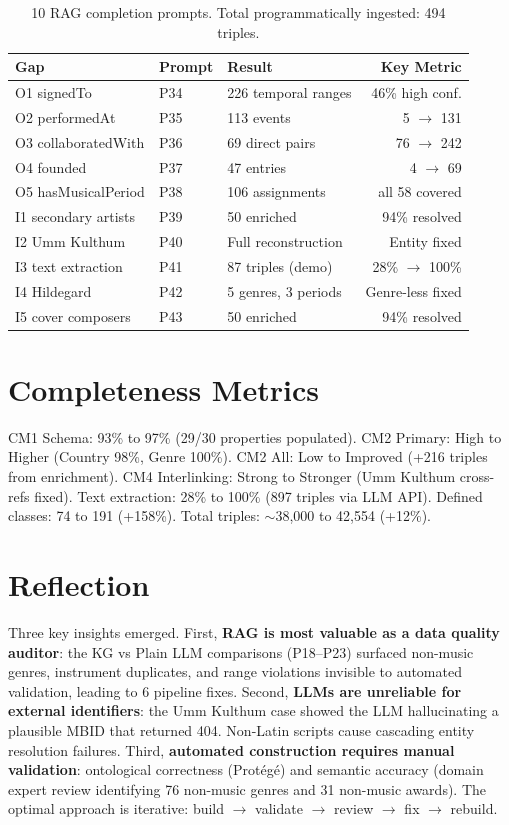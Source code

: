 \documentclass[11pt,a4paper]{article}
\begin{document}
\begin{table}[h]
\centering
\small
\begin{tabular}{lllr}
\toprule
\textbf{Gap} & \textbf{Prompt} & \textbf{Result} & \textbf{Key Metric} \\
\midrule
O1 signedTo & P34 & 226 temporal ranges & 46\% high conf. \\
O2 performedAt & P35 & 113 events & 5 $\rightarrow$ 131 \\
O3 collaboratedWith & P36 & 69 direct pairs & 76 $\rightarrow$ 242 \\
O4 founded & P37 & 47 entries & 4 $\rightarrow$ 69 \\
O5 hasMusicalPeriod & P38 & 106 assignments & all 58 covered \\
I1 secondary artists & P39 & 50 enriched & 94\% resolved \\
I2 Umm Kulthum & P40 & Full reconstruction & Entity fixed \\
I3 text extraction & P41 & 87 triples (demo) & 28\% $\rightarrow$ 100\% \\
I4 Hildegard & P42 & 5 genres, 3 periods & Genre-less fixed \\
I5 cover composers & P43 & 50 enriched & 94\% resolved \\
\bottomrule
\end{tabular}
\caption{10 RAG completion prompts. Total programmatically ingested: 494 triples.}
\end{table}

\section{Completeness Metrics}

CM1 Schema: 93\% to 97\% (29/30 properties populated). CM2 Primary: High to Higher (Country 98\%, Genre 100\%). CM2 All: Low to Improved (+216 triples from enrichment). CM4 Interlinking: Strong to Stronger (Umm Kulthum cross-refs fixed). Text extraction: 28\% to 100\% (897 triples via LLM API). Defined classes: 74 to 191 (+158\%). Total triples: $\sim$38,000 to 42,554 (+12\%).

\section{Reflection}

Three key insights emerged. First, \textbf{RAG is most valuable as a data quality auditor}: the KG vs Plain LLM comparisons (P18--P23) surfaced non-music genres, instrument duplicates, and range violations invisible to automated validation, leading to 6 pipeline fixes. Second, \textbf{LLMs are unreliable for external identifiers}: the Umm Kulthum case showed the LLM hallucinating a plausible MBID that returned 404. Non-Latin scripts cause cascading entity resolution failures. Third, \textbf{automated construction requires manual validation}: ontological correctness (Prot\'{e}g\'{e}) and semantic accuracy (domain expert review identifying 76 non-music genres and 31 non-music awards). The optimal approach is iterative: build $\rightarrow$ validate $\rightarrow$ review $\rightarrow$ fix $\rightarrow$ rebuild.
\end{document}
